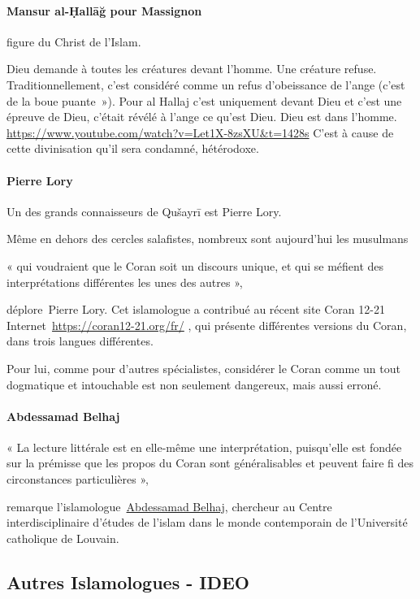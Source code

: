   \paragraph{Mansur al-Ḥallāğ pour Massignon} figure du Christ de l'Islam.

  Dieu demande à toutes les créatures devant l'homme. Une créature
  refuse. Traditionnellement, c'est considéré comme un refus
  d'obeissance de l'ange (c'est de la boue puante~»). Pour al Hallaj
  c'est uniquement devant Dieu et c'est une épreuve de Dieu, c'était
  révélé à l'ange ce qu'est Dieu. Dieu est dans l'homme.
  \url{https://www.youtube.com/watch?v=Let1X-8zsXU\&t=1428s}
  C'est à cause de cette divinisation qu'il sera condamné, hétérodoxe.

\paragraph{Pierre Lory}
\label{Theol:PierreLory}
Un des grands connaisseurs de Qušayrī est
Pierre Lory.

Même en dehors des cercles salafistes, nombreux sont aujourd'hui les
musulmans~

\begin{cite}
« qui voudraient que le Coran soit un discours unique,
et qui se méfient des interprétations différentes les unes des autres
»,~
\end{cite}
\emph{}déplore~{{Pierre
Lory}}. Cet islamologue a contribué au récent site {{Coran 12-21}}
Internet~\url{https://coran12-21.org/fr/} , qui
présente différentes versions du Coran, dans trois langues différentes.

Pour lui, comme pour d'autres spécialistes, considérer le Coran comme un
tout dogmatique et intouchable est non seulement dangereux, mais aussi
erroné.

\paragraph{Abdessamad
Belhaj}
\begin{cite}
« La lecture littérale est en elle-même une
interprétation, puisqu'elle est fondée sur la prémisse que les propos du
Coran sont généralisables et peuvent faire fi des circonstances
particulières »,~
\end{cite}
remarque
l'islamologue~{\underline{Abdessamad
Belhaj}}, chercheur au Centre interdisciplinaire d'études de l'islam
dans le monde contemporain de l'Université catholique de Louvain.

\subsection{Autres Islamologues - IDEO}
